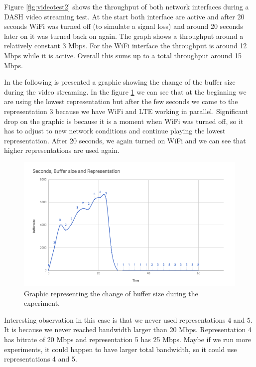 \documentclass{llncs}
\begin{document}
Figure \ref{fig:videotest2} shows the throughput of both network interfaces during a DASH video streaming test. At the start both interface are active and after 20 seconds WiFi was turned off (to simulate a signal loss) and around 20 seconds later on it was turned back on again. The graph shows a throughput around a relatively constant 3 Mbps. For the WiFi interface the throughput is around 12 Mbps while it is active. Overall this sums up to a total throughput around 15 Mbps.

In the following is presented a graphic showing the change of the buffer size during the video streaming. In the figure \ref{fig:buffer2} we can see that at the beginning we are using the lowest representation but after the few seconds we came to the representation 3 because we have WiFi and LTE working in parallel. Significant drop on the graphic is because it is a moment when WiFi was turned off, so it has to adjust to new network conditions and continue playing the lowest representation. After 20 seconds, we again turned on WiFi and we can see that higher representations are used again. 

 
\begin{figure}[H]
\centering
\includegraphics[width=1.0\textwidth]{buffer-test-2.png}
\caption{\label{fig:buffer2} Graphic representing the change of buffer size during the experiment.}
\end{figure}

Interesting observation in this case is that we never used representations 4 and 5. It is because we never reached bandwidth larger than 20 Mbps. Representation 4 has bitrate of 20 Mbps and representation 5 has 25 Mbps. Maybe if we run more experiments, it could happen to have larger total bandwidth, so it could use representations 4 and 5.
\end{document}
